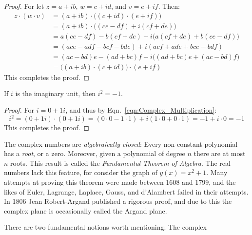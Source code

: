     \begin{proof}
        For let $z=a+ib$, $w=c+id$, and $v=e+if$. Then:
        \begin{subequations}
            \begin{align}
                z\cdot(w\cdot{v})
                    &=(a+ib)\cdot\Big((c+id)\cdot(e+if)\Big)\\
                    &=(a+ib)\cdot\Big((ce-df)+i(cf+de)\Big)\\
                    &=a(ce-df)-b(cf+de)+i\big(a(cf+de)+b(ce-df)\big)\\
                    &=(ace-adf-bcf-bde)+i(acf+ade+bce-bdf)\\
                    &=(ac-bd)e-(ad+bc)f+i\big((ad+bc)e+(ac-bd)f\big)\\
                    &=\Big((a+ib)\cdot(c+id)\Big)\cdot(e+if)
            \end{align}
        \end{subequations}
        This completes the proof.
    \end{proof}
    \begin{theorem}
        If $i$ is the imaginary unit, then $i^{2}=\minus{1}$.
    \end{theorem}
    \begin{proof}
        For $i=0+1i$, and thus by Eqn.~\ref{eqn:Complex_Multiplication}:
        \begin{equation}
            i^{2}=(0+1i)\cdot(0+1i)
                 =(0\cdot{0}-1\cdot{1})+i(1\cdot{0}+0\cdot{1})
                 =\minus{1}+i\cdot{0}
                 =\minus{1}
        \end{equation}
        This completes the proof.
    \end{proof}
    The complex numbers are \textit{algebraically closed}:
    Every non-constant polynomial has a \textit{root}, or a zero.
    Moreover, given a polynomial of degree $n$ there are at most
    $n$ roots. This result is called the
    \textit{Fundamental Theorem of Algebra}. The real numbers lack this
    feature, for consider the graph of $y(x)=x^{2}+1$. Many attempts at
    proving this theorem were made between 1608 and 1799, and the likes of
    Euler, Lagrange, Laplace, Gauss, and d'Alambert failed in their
    attempts. In 1806 Jean Robert-Argand published a rigorous proof, and
    due to this the complex plane is occasionally called the Argand plane.
    \par\hfill\par
    There are two fundamental notions worth mentioning: The complex
